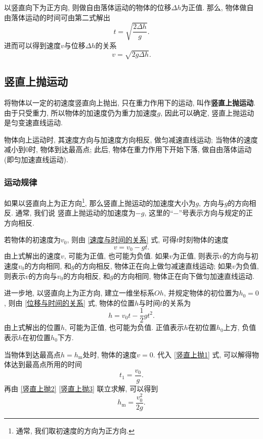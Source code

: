 \documentclass[11pt,a4paper]{ctexbook}
\begin{document}
以竖直向下为正方向, 则做自由落体运动的物体的位移$\Delta h$为正值. 那么,
物体做自由落体运动的时间可由第二式解出
$$t = \sqrt{\frac{2\Delta h}{g}}.$$
进而可以得到速度$v$与位移$\Delta h$的关系$$v = \sqrt{2g\Delta h}.$$

\subsection{竖直上抛运动}
将物体以一定的初速度竖直向上抛出, 只在重力作用下的运动, 叫作\textbf{竖直上抛运动}.
由于只受重力, 所以物体的加速度仍为重力加速度$g$,
因此可以确定, 竖直上抛运动是匀变速直线运动.

物体向上运动时, 其速度方向与加速度方向相反, 做匀减速直线运动;
当物体的速度减小到0时, 物体到达最高点; 此后, 物体在重力作用下开始下落,
做自由落体运动(即匀加速直线运动).

\subsubsection{运动规律}
如果以竖直向上为正方向\footnote{通常, 我们取初速度的方向为正方向.},
那么竖直上抛运动的加速度大小为$g$, 方向与$g$的方向相反. 通常, 我们说
竖直上抛运动的加速度为$-g$, 这里的``$-$''号表示方向与规定的正方向相反.

若物体的初速度为$v_0$, 则由 \eqref{速度与时间的关系} 式,
可得$t$时刻物体的速度
\begin{equation}
    v = v_0 - gt.
    \label{竖直上抛1}
\end{equation}
由上式解出的速度$v$, 可能为正值, 也可能为负值. 如果$v$为正值, 则表示$v$的方向与初速度$v_0$的方向相同, 和$g$的方向相反,
物体正在向上做匀减速直线运动; 如果$v$为负值, 则表示$v$的方向与$v_0$的方向相反, 和$g$的方向相同, 物体正在向下做匀加速直线运动.

进一步地, 以竖直向上为正方向, 建立一维坐标系$Oh$, 并规定物体的初位置为$h_0 = 0$,
则由 \eqref{位移与时间的关系} 式, 物体的位置$h$与时间$t$的关系为
\begin{equation}
    h = v_0t-\frac12 gt^2.
\label{竖直上抛2}
\end{equation}
由上式解出的位置$h$, 可能为正值, 也可能为负值. 正值表示$h$在初位置$h_0$上方,
负值表示$h$在初位置$h_0$下方.

当物体到达最高点$h = h_\text{m}$处时, 物体的速度$v = 0$. 代入 \eqref{竖直上抛1} 式,
可以解得物体达到最高点所用的时间
\begin{equation}
t_1 = \frac{v_0}{g}.
\label{竖直上抛3}
\end{equation}
再由 \eqref{竖直上抛2} \eqref{竖直上抛3} 联立求解, 可以得到
$$h_\text{m} = \frac{v_0^2}{2g}.$$
\end{document}
